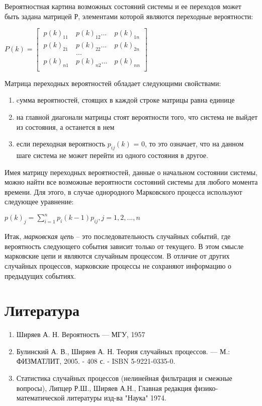 \documentclass[12pt]{article}
\begin{document}
Вероятностная картина возможных состояний системы и ее переходов может быть задана матрицей Р, элементами которой являются переходные
вероятности: 

\begin{center}

$ P(k)= \begin{bmatrix}
		\ p(k)_{11}& \ p(k)_{12}...& \ p(k)_{1n}\\
		\ p(k)_{21}& \ p(k)_{22}...& \ p(k)_{2n}\\
		\ & \ ... & \ \\
		\ p(k)_{n1}& \ p(k)_{n2}...& \ p(k)_{nn}\\
		\end{bmatrix}
$
\end{center}

Матрица переходных вероятностей обладает следующими свойствами:
\begin{enumerate}
\item cумма вероятностей, стоящих в каждой строке матрицы равна единице
\item на главной диагонали матрицы стоят вероятности того, что система не выйдет из состояния,  а останется в нем
\item если переходная вероятность $p_{ij}(k)$ = 0, то это означает, что на данном шаге система не может перейти из одного состояния в другое.
\end{enumerate}

Имея матрицу переходных вероятностей, данные о начальном состоянии системы, можно найти все возможные вероятности состояний системы для любого момента времени. Для этого, в случае однородного Марковского процесса используют следующее уравнение:
\begin{center}
$p(k)_j = \sum_{i=1}^n p_i (k-1)  p_{ij} , j = 1, 2, ... , n$
\end{center}

Итак, \textit{марковская цепь} – это последовательность случайных событий, где вероятность следующего события зависит только от текущего. В этом смысле марковские цепи и  являются случайным процессом. В отличие от других случайных процессов, марковские процессы не сохраняют информацию о предыдущих событиях.

\section{Литература}

\begin{enumerate}

\item Ширяев А. Н. Вероятность –– МГУ, 1957

\item Булинский А. В., Ширяев А. Н. Теория случайных процессов. — М.: ФИЗМАТЛИТ, 2005. - 408 с. - ISBN 5-9221-0335-0.

\item Статистика случайных процессов (нелинейная фильтрация и смежные вопросы), Липцер Р.Ш., Ширяев А.Н., Главная редакция физико-математической литературы изд-ва "Наука" 1974.

\end{enumerate}
\end{document}
